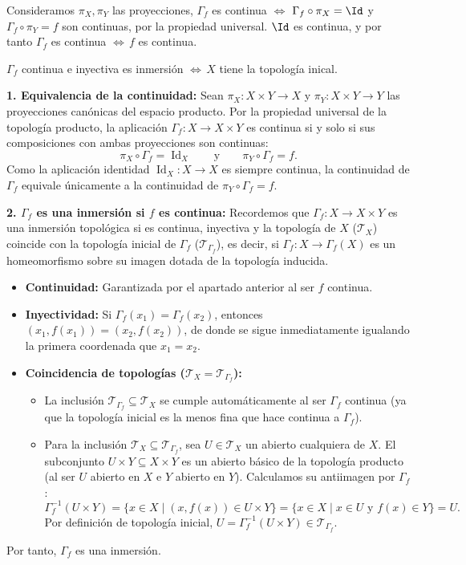 \begin{sol}
    Consideramos $\pi_X, \pi_Y$ las proyecciones, $\Gamma_f$ es continua $\iff$ $\Gamma_f \circ \pi_X = \Id$ y $\Gamma_f \circ \pi_Y = f$ son continuas, por la propiedad universal. $\Id$ es continua, y por tanto $\Gamma_f$ es continua $\iff \, f$ es continua.
    
    $\Gamma_f$ continua e inyectiva es inmersi\'on $\iff \, X $ tiene la topolog\'ia inical.  

    \textbf{1. Equivalencia de la continuidad:}
Sean $\pi_X: X \times Y \to X$ y $\pi_Y: X \times Y \to Y$ las proyecciones canónicas del espacio producto. Por la propiedad universal de la topología producto, la aplicación $\Gamma_f: X \to X \times Y$ es continua si y solo si sus composiciones con ambas proyecciones son continuas:
\[
    \pi_X \circ \Gamma_f = \operatorname{Id}_X \qquad \text{y} \qquad \pi_Y \circ \Gamma_f = f.
\]
Como la aplicación identidad $\operatorname{Id}_X: X \to X$ es siempre continua, la continuidad de $\Gamma_f$ equivale únicamente a la continuidad de $\pi_Y \circ \Gamma_f = f$.

\vspace{0.3cm}
\noindent\textbf{2. $\Gamma_f$ es una inmersión si $f$ es continua:}
Recordemos que $\Gamma_f: X \to X \times Y$ es una inmersión topológica si es continua, inyectiva y la topología de $X$ ($\mathcal{T}_X$) coincide con la topología inicial de $\Gamma_f$ ($\mathcal{T}_{\Gamma_f}$), es decir, si $\Gamma_f: X \to \Gamma_f(X)$ es un homeomorfismo sobre su imagen dotada de la topología inducida.
\begin{itemize}
    \item \textbf{Continuidad:} Garantizada por el apartado anterior al ser $f$ continua.
    \item \textbf{Inyectividad:} Si $\Gamma_f(x_1) = \Gamma_f(x_2)$, entonces $(x_1, f(x_1)) = (x_2, f(x_2))$, de donde se sigue inmediatamente igualando la primera coordenada que $x_1 = x_2$.
    \item \textbf{Coincidencia de topologías ($\mathcal{T}_X = \mathcal{T}_{\Gamma_f}$):} 
    \begin{itemize}
        \item La inclusión $\mathcal{T}_{\Gamma_f} \subseteq \mathcal{T}_X$ se cumple automáticamente al ser $\Gamma_f$ continua (ya que la topología inicial es la menos fina que hace continua a $\Gamma_f$).
        \item Para la inclusión $\mathcal{T}_X \subseteq \mathcal{T}_{\Gamma_f}$, sea $U \in \mathcal{T}_X$ un abierto cualquiera de $X$. El subconjunto $U \times Y \subseteq X \times Y$ es un abierto básico de la topología producto (al ser $U$ abierto en $X$ e $Y$ abierto en $Y$). Calculamos su antiimagen por $\Gamma_f$:
        \[
            \Gamma_f^{-1}(U \times Y) = \{x \in X \mid (x, f(x)) \in U \times Y\} = \{x \in X \mid x \in U \text{ y } f(x) \in Y\} = U.
        \]
        Por definición de topología inicial, $U = \Gamma_f^{-1}(U \times Y) \in \mathcal{T}_{\Gamma_f}$.
    \end{itemize}
\end{itemize}
Por tanto, $\Gamma_f$ es una inmersión.


\end{sol}
